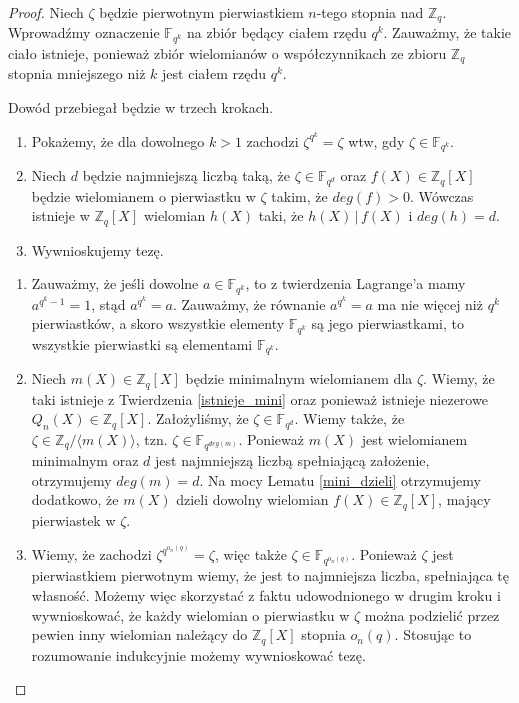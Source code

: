 \documentclass[declaration,shortabstract]{iithesis}
\theoremstyle{definition}
\theoremstyle{remark} \newtheorem{observation}{Obserwacja}
\theoremstyle{plain} \newtheorem{theorem}{Twierdzenie}
\theoremstyle{plain} \newtheorem{lemma}{Lemat}
\theoremstyle{remark} \newtheorem*{remark*}{Uwaga}
\theoremstyle{reminder} \newtheorem*{reminder*}{Przypomnienie}
\begin{document}
\begin{proof}
	Niech $\zeta$ będzie pierwotnym pierwiastkiem $n$-tego stopnia nad $\mathbb{Z}_q$. Wprowadźmy oznaczenie $\mathbb{F}_{q^k}$ na zbiór będący ciałem rzędu $q^k$. Zauważmy, że takie ciało istnieje, ponieważ zbiór wielomianów o współczynnikach ze zbioru $\mathbb{Z}_q$ stopnia mniejszego niż $k$ jest ciałem rzędu $q^k$.
				    
	Dowód przebiegał będzie w trzech krokach. 
	\begin{enumerate}[label=\arabic*.,leftmargin=.4in]
		\item Pokażemy, że dla dowolnego $k > 1$ zachodzi $\zeta^{q^k}=\zeta$ wtw, gdy $\zeta \in \mathbb{F}_{q^k}$.
        \item Niech $d$ będzie najmniejszą liczbą taką, że $\zeta \in \mathbb{F}_{q^d}$ oraz $f(X) \in \mathbb{Z}_q[X]$ będzie wielomianem o pierwiastku w $\zeta$ takim, że $deg(f) > 0$. Wówczas istnieje w $\mathbb{Z}_q[X]$ wielomian $h(X)$ taki, że $h(X) \, | \, f(X)$ i $deg(h) = d$.
        \item Wywnioskujemy tezę.
	\end{enumerate}
	\begin{enumerate}[label=Ad.\arabic*.,leftmargin=.4in]
		\item Zauważmy, że jeśli dowolne $a \in \mathbb{F}_{q^k}$, to z twierdzenia Lagrange'a mamy $a^{q^k-1} = 1$, stąd $a^{q^k} = a$. Zauważmy, że równanie $a^{q^k} = a$ ma nie więcej niż $q^k$ pierwiastków, a skoro wszystkie elementy $\mathbb{F}_{q^k}$ są jego pierwiastkami, to wszystkie pierwiastki są elementami $\mathbb{F}_{q^k}$.
        \item Niech $m(X) \in \mathbb{Z}_q[X]$ będzie minimalnym wielomianem dla $\zeta$. Wiemy, że taki istnieje z Twierdzenia \ref{istnieje_mini} oraz ponieważ istnieje niezerowe $Q_n(X) \in \mathbb{Z}_q[X]$. Założyliśmy, że $\zeta \in \mathbb{F}_{q^d}$. Wiemy także, że $\zeta \in \mathbb{Z}_q / \langle m(X) \rangle$, tzn. $\zeta \in \mathbb{F}_{q^{deg(m)}}$. Ponieważ $m(X)$ jest wielomianem minimalnym oraz $d$ jest najmniejszą liczbą spełniającą założenie, otrzymujemy $deg(m) = d$. Na mocy Lematu \ref{mini_dzieli} otrzymujemy dodatkowo, że $m(X)$ dzieli dowolny wielomian $f(X) \in \mathbb{Z}_q[X]$, mający pierwiastek w $\zeta$.
        \item Wiemy, że zachodzi $\zeta^{q^{o_n(q)}}=\zeta$, więc także $\zeta \in \mathbb{F}_{q^{o_n(q)}}$. Ponieważ $\zeta$ jest pierwiastkiem pierwotnym wiemy, że jest to najmniejsza liczba, spełniająca tę własność. Możemy więc skorzystać z faktu udowodnionego w drugim kroku i wywnioskować, że każdy wielomian o pierwiastku w $\zeta$ można podzielić przez pewien inny wielomian należący do $\mathbb{Z}_q[X]$ stopnia $o_n(q)$. Stosując to rozumowanie indukcyjnie możemy wywnioskować tezę.

\end{enumerate}
\end{proof}
\end{document}
